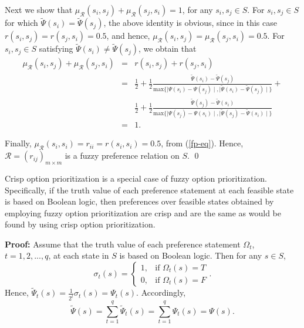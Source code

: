 Next we show that $\mu_{\mathcal{R}}(s_i, s_j)+\mu_{\mathcal{R}}(s_j, s_i)=1$, for any $s_i, s_j \in S$. For $s_i, s_j \in S$ for which $\widetilde{\Psi}(s_i)=\widetilde{\Psi}(s_j)$, the above identity is obvious, since in this case $r(s_i, s_j)=r(s_j, s_i)=0.5$, and hence, $\mu_{\mathcal{R}}(s_i, s_j)=\mu_{\mathcal{R}}(s_j, s_i)=0.5$. For $s_i, s_j \in S$ satisfying $\widetilde{\Psi}(s_i) \neq \widetilde{\Psi}(s_j)$, we obtain that
\begin{equation*}
\begin{array}{rcl}
\mu_{\mathcal{R}}(s_i, s_j)+\mu_{\mathcal{R}}(s_j, s_i)
&=&r(s_i, s_j)+r(s_j, s_i) \\
&=&\frac{1}{2}+\frac{1}{2}\frac{\widetilde{\Psi}(s_i)-\widetilde{\Psi}(s_j)}{\text{max}\{{\mid \Psi(s_i)-\Psi(s_j) \mid}, {\mid \widetilde{\Psi}(s_i)-\widetilde{\Psi}(s_j) \mid}\}}+ \\
& & \frac{1}{2}+\frac{1}{2} \frac{\widetilde{\Psi}(s_j)-\widetilde{\Psi}(s_i)}{\text{max}\{{\mid \Psi(s_j)-\Psi(s_i) \mid}, {\mid \widetilde{\Psi}(s_j)-\widetilde{\Psi}(s_i) \mid}\}} \\
&=&1.
\end{array}
\end{equation*}

\noindent Finally, $\mu_{\mathcal{R}}(s_i, s_i)=r_{ii}=r(s_i, s_i)=0.5$, from (\ref{fp-eq}). Hence, $\mathcal{R}=(r_{ij})_{m \times m}$ is a fuzzy preference relation on $S$. \qed

\begin{theorem}\label{thm-cop-sc-fop}
\rm Crisp option prioritization is a special case of fuzzy option prioritization. Specifically, if the truth value of each preference statement at each feasible state is based on Boolean logic, then preferences over feasible states obtained by employing fuzzy option prioritization are crisp and are the same as would be found by using crisp option prioritization.
\end{theorem}

{\bf Proof:} Assume that the truth value of each preference statement $\Omega_t$, $t=1, 2, ..., q$, at each state in $S$ is based on Boolean logic.
Then for any $s\in S$,
$$\sigma_t(s)=\left\{ \begin{array}{ll}
 1, & \text{if } \Omega_t(s)=T \\
 0, & \text{if } \Omega_t(s)=F
 \end{array}
 \right..$$
Hence, $\widetilde{\Psi}_t(s)=\frac{1}{2^t}\sigma_t(s)=\Psi_t(s)$. Accordingly,
$$\widetilde{\Psi}(s)=\displaystyle\sum\limits_{t=1}^q \widetilde{\Psi}_t(s)=\displaystyle\sum\limits_{t=1}^q \Psi_t(s)=\Psi(s).$$

